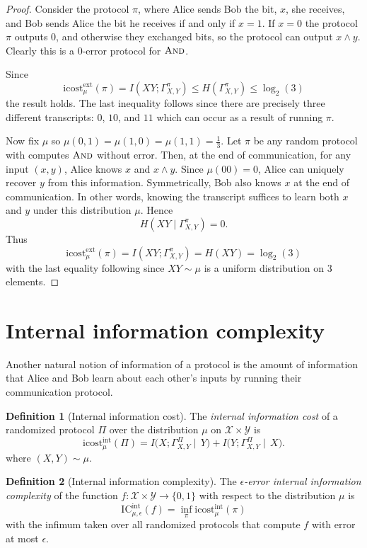 \documentclass[11pt]{amsart}
\theoremstyle{plain}
\theoremstyle{definition}
\newtheorem{definition}{Definition}
\theoremstyle{plain}
\newcommand{\calX}{\mathcal{X}}
\newcommand{\calY}{\mathcal{Y}}
\newcommand{\ICint}{\mathrm{IC}^{\mathrm{int}}}
\newcommand{\icostext}{\mathrm{icost}^{\mathrm{ext}}}
\newcommand{\icostint}{\mathrm{icost}^{\mathrm{int}}}
\begin{document}
\begin{proof}
Consider the protocol $\pi$, where Alice sends Bob the bit, $x$, she receives, and Bob sends Alice the bit he receives if and only if $x=1$. If $x=0$ the protocol $\pi$ outputs $0$, and otherwise they exchanged bits, so the protocol can output $x\wedge y$. Clearly this is a $0$-error protocol for $\textsc{And}$.

Since 
$$\icostext_\mu(\pi) = I(XY; \Gamma^\pi_{X,Y}) \leq H(\Gamma^\pi_{X,Y}) \leq \log_2(3)$$
the result holds. The last inequality follows since there are precisely three different transcripts: $0$, $10$, and $11$ which can occur as a result of running $\pi$.

Now fix $\mu$ so $\mu(0,1) = \mu(1,0) = \mu(1,1) = \frac{1}{3}$. Let $\pi$ be any random protocol with computes $\textsc{And}$ without error. Then, at the end of communication, for any input $(x,y)$, Alice knows $x$ and $x\wedge y$. Since $\mu(00) = 0$, Alice can uniquely recover $y$ from this information. Symmetrically, Bob also knows $x$ at the end of communication. In other words, knowing the transcript suffices to learn both $x$ and $y$ under this distribution $\mu$. Hence
$$H(XY \mid \Gamma^\pi_{X,Y}) = 0.$$
Thus
$$\icostext_\mu(\pi) = I(XY;\Gamma^{\pi}_{X,Y}) = H(XY) =\log_2(3)$$
with the last equality following since $XY\sim \mu$ is a uniform distribution on $3$ elements.
\end{proof}


\newpage 
\section{Internal information complexity}

Another natural notion of information of a protocol is the amount of information that Alice and Bob learn about each other's inputs by running their communication protocol.

\begin{definition}[Internal information cost]
The \emph{internal information cost} of a randomized protocol $\Pi$ over the distribution $\mu$ on $\calX \times \calY$ is
\[
\icostint_\mu(\Pi) = I\big( X ; \Gamma_{X,Y}^\Pi\mid \, Y\big) + I\big( Y ; \Gamma_{X,Y}^\Pi \mid\, X\big).
\]
where $(X,Y) \sim \mu$.
\end{definition}

\begin{definition}[Internal information complexity]
The \emph{$\epsilon$-error internal information complexity} of the function $f : \calX \times \calY \to \{0,1\}$ with respect to the distribution $\mu$ is
\[
\ICint_{\mu,\epsilon}(f) = \inf_{\pi} \icostint_\mu(\pi)
\]
with the infimum taken over all randomized protocols that compute $f$ with error at most $\epsilon$.
\end{definition}
\end{document}
